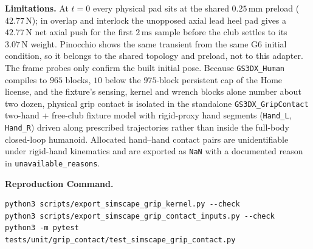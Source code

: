 \documentclass[11pt,a4paper]{article}
\begin{document}
\textbf{Limitations.}
At $t = 0$ every physical pad sits at the shared $0.25\,\mathrm{mm}$ preload ($42.77\,\mathrm{N}$); in overlap and interlock the unopposed axial lead heel pad gives a $42.77\,\mathrm{N}$ net axial push for the first $2\,\mathrm{ms}$ sample before the club settles to its $3.07\,\mathrm{N}$ weight. Pinocchio shows the same transient from the same G6 initial condition, so it belongs to the shared topology and preload, not to this adapter. The frame probes only confirm the built initial pose.
Because \texttt{GS3DX\_Human} compiles to $965$ blocks, $10$ below the $975$-block persistent cap of the Home license, and the fixture's sensing, kernel and wrench blocks alone number about two dozen, physical grip contact is isolated in the standalone \texttt{GS3DX\_GripContact} two-hand + free-club fixture model with rigid-proxy hand segments (\texttt{Hand\_L}, \texttt{Hand\_R}) driven along prescribed trajectories rather than inside the full-body closed-loop humanoid. Allocated hand--hand contact pairs are unidentifiable under rigid-hand kinematics and are exported as \texttt{NaN} with a documented reason in \texttt{unavailable\_reasons}.

\textbf{Reproduction Command.}
\begin{verbatim}
python3 scripts/export_simscape_grip_kernel.py --check
python3 scripts/export_simscape_grip_contact_inputs.py --check
python3 -m pytest tests/unit/grip_contact/test_simscape_grip_contact.py
\end{verbatim}
\end{document}
